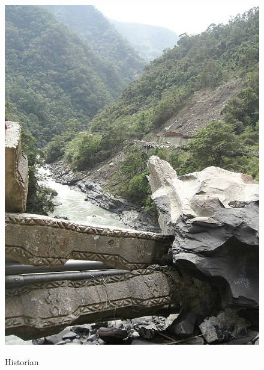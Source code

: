 \documentclass{article}
\begin{document}
\pagestyle{empty}
\thispagestyle{empty}
\pagecolor{aqua!30}

\begin{figure}[h]
\begin{adjustbox}{minipage=[c]{\textwidth-10mm},margin= 5mm 15mm 5mm 13mm, frame=1pt, bgcolor=almond,env=center}%
\begin{center}
\includegraphics[trim=0mm 40mm 0mm 40mm, clip,width=.6\paperwidth]{river_damage.jpg}
\end{center}

\begin{center}
\begin{minipage}[t]{0.7\paperwidth}

\medskip
{\huge Historian}
\bigskip


\end{minipage}
\end{center}
\end{adjustbox}
\end{figure}
\end{document}
